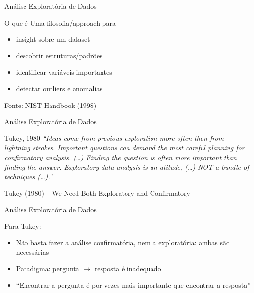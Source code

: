 \documentclass{beamer}
\begin{document}
\begin{frame}{Análise Exploratória de Dados}
  \begin{block}{O que é}
    \scriptsize
    Uma filosofia/approach para

    \bigskip
    \begin{itemize}
      \footnotesize
    \item insight sobre um dataset
      \medskip
    \item descobrir estruturas/padrões
      \medskip
    \item identificar variáveis importantes
      \medskip
    \item detectar outliers e anomalias
    \end{itemize}
  \end{block}

  \vfill
  \scriptsize
  \hfill Fonte: NIST Handbook (1998)
\end{frame}

\begin{frame}{Análise Exploratória de Dados}
  \begin{block}{Tukey, 1980}
    \footnotesize {\em ``Ideas come from previous exploration more
      often than from lightning strokes. Important questions can
      demand the most careful planning for confirmatory
      analysis. (\ldots) \alert<2>{Finding the question is often more
        important than finding the answer.} Exploratory data analysis
      is an atitude, (\ldots) NOT a bundle of techniques (\ldots).''}
  \end{block}

  \vfill
  \scriptsize
  \hfill Tukey (1980) -- We Need Both Exploratory and Confirmatory
\end{frame}

\begin{frame}{Análise Exploratória de Dados}
  \begin{block}{Para Tukey:}
  \begin{itemize}
    \footnotesize
  \item Não basta fazer a análise confirmatória, nem a exploratória:
    \alert{ambas} são necessárias
    \bigskip
  \item Paradigma: pergunta $\rightarrow$ resposta é inadequado
    \bigskip
  \item ``Encontrar a pergunta é por vezes mais importante que
    encontrar a resposta''
  \end{itemize}
\end{block}
\end{frame}
\end{document}
